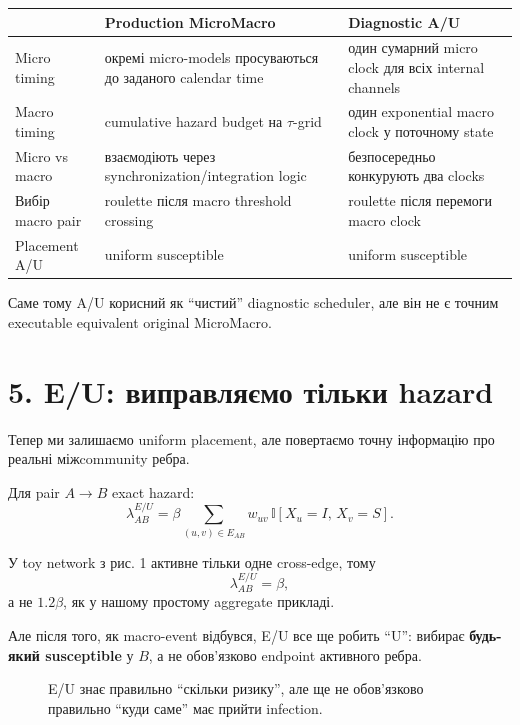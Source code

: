 \documentclass[11pt,a4paper]{article}
\newcommand{\I}{\mathbb{I}}
\begin{document}
\begin{center}
\begin{tabular}{>{\raggedright\arraybackslash}p{42mm} >{\raggedright\arraybackslash}p{52mm} >{\raggedright\arraybackslash}p{52mm}}
\toprule
 & \textbf{Production MicroMacro} & \textbf{Diagnostic A/U}\\
\midrule
Micro timing & окремі micro-models просуваються до заданого calendar time & один сумарний micro clock для всіх internal channels\\
Macro timing & cumulative hazard budget на $\tau$-grid & один exponential macro clock у поточному state\\
Micro vs macro & взаємодіють через synchronization/integration logic & безпосередньо конкурують два clocks\\
Вибір macro pair & roulette після macro threshold crossing & roulette після перемоги macro clock\\
Placement A/U & uniform susceptible & uniform susceptible\\
\bottomrule
\end{tabular}
\end{center}

Саме тому A/U корисний як ``чистий'' diagnostic scheduler, але він не є точним executable equivalent original MicroMacro.


\section*{5. E/U: виправляємо тільки hazard}

Тепер ми залишаємо uniform placement, але повертаємо точну інформацію про реальні міжcommunity ребра.

Для pair $A\to B$ exact hazard:
\[
 \lambda^{E/U}_{AB}
 =\beta\sum_{(u,v)\in E_{AB}} w_{uv}\,\I[X_u=I,\,X_v=S].
\]

У toy network з рис. 1 активне тільки одне cross-edge, тому
\[
 \lambda^{E/U}_{AB}=\beta,
\]
а не $1.2\beta$, як у нашому простому aggregate прикладі.

Але після того, як macro-event відбувся, E/U все ще робить ``U'': вибирає \textbf{будь-який susceptible} у $B$, а не обов'язково endpoint активного ребра.

\begin{figure}[h!]
\centering
{}
\caption{E/U знає правильно ``скільки ризику'', але ще не обов'язково правильно ``куди саме'' має прийти infection.}
\end{figure}
\end{document}
